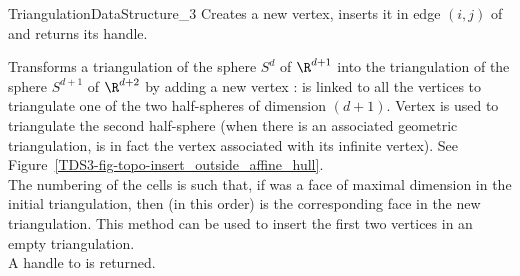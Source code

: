 \begin{ccRefConcept}{TriangulationDataStructure_3}
{Creates a new vertex, inserts it in edge $(i,j)$ of  and returns its
handle.
}

{Transforms a triangulation of the sphere $S^d$ of $\R^{d+1}$ into the
triangulation of the sphere $S^{d+1}$ of $\R^{d+2}$ by adding a new vertex
:  
 is linked to all the vertices to triangulate one of the two
half-spheres of dimension $(d+1)$. Vertex  is used to
triangulate the second half-sphere (when there is an associated
geometric triangulation,  is in fact the vertex associated with
its infinite vertex).
See Figure~\ref{TDS3-fig-topo-insert_outside_affine_hull}.\\  
The numbering of the cells is such that, if  was a face of
maximal dimension in the initial triangulation, then  (in
this order) is the corresponding face in the new triangulation.
This method can be used to insert the first two vertices in an empty
triangulation.\\
A handle to  is returned.
} 


\end{ccRefConcept}

